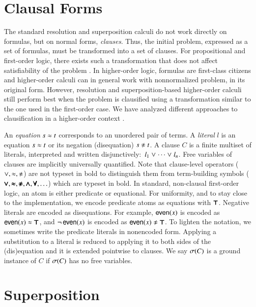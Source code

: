\section{Clausal Forms}
\label{sec:pre:clauses}

The standard resolution and superposition calculi do not work directly on formulas, but
on normal forms, {\em clauses}. Thus, the initial problem, expressed as a
set of formulas, must be transformed into a set of clauses. For propositional
and first-order logic, there exists such a transformation that does not affect
satisfiability of the problem \cite{nw-01-small-cnf}. In higher-order logic,
formulas are first-class citizens and higher-order calculi can in general work
with nonnormalized problem, in its original form. However, resolution and
superposition-based higher-order calculi still perform best when the problem is clausified
using a transformation similar to the one used in the first-order case. We have analyzed
different approaches to clausification in a higher-order context \cite{bbtv-21-full-ho-sup}.

An {\em equation} $s \approx t$ corresponds to an unordered pair of terms. A {\em
literal} $l$ is an equation $s \approx t$ or its negation (disequation) $s \noteq
t$. A clause $C$ is a finite multiset of literals, interpreted and written
disjunctively:\ $l_1 \mathrel\lor \cdots \mathrel\lor l_n$. Free variables of clauses are
implicitly universally quantified. Note that clause-level operators ($\llor, \eq, \noteq$) are not typeset in bold
to distinguish them from term-building symbols ($\pmb{\lor}, \pmb{\approx}, \pmb{\not\approx}, \pmb{\land}, \pmb{\forall}, \ldots$) which are typeset in bold. In standard,
non-clausal first-order logic, an atom is either predicate or equational. For
uniformity, and to stay close to the implementation, we encode predicate atoms
as equations with $\pmb{\top}$. Negative literals are encoded as disequations. For
example, $\mathsf{even}(x)$ is encoded as $\mathsf{even}(x) \approx \pmb{\top}$, and
$\neg\,\mathsf{even}(x)$ is encoded as $\mathsf{even}(x) \not\approx \pmb{\top}$. To lighten the
notation, we sometimes write the predicate literals in nonencoded form.
Applying a substitution to a literal is reduced to applying it to both sides of
the (dis)equa\-tion and it is extended pointwise to clauses. We say
$\sigma(C)$ is a ground instance of $C$ if $\sigma(C)$ has no free variables.
\pagebreak[2]

\section{Superposition}
\label{sec:pre:sup}

